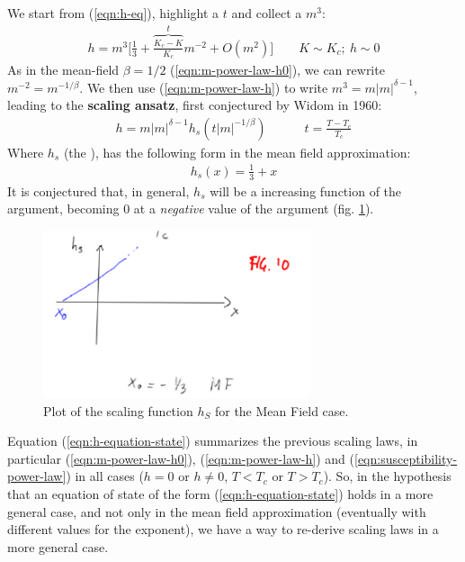 \documentclass[../../main.tex]{subfiles}
\begin{document}
We start from (\ref{eqn:h-eq}), highlight a $t$ and collect a $m^3$:
\begin{align*}
    h = m^3 \Bigg[\frac{1}{3} + \overbrace{\frac{K_c - K}{K_c}}^{t}m^{-2} + O(m^2) \Bigg] \qquad K \sim K_c;\> h\sim 0
\end{align*}
As in the mean-field $\beta = 1/2$ (\ref{eqn:m-power-law-h0}), we can rewrite $m^{-2} = m^{-1/\beta}$. We then use (\ref{eqn:m-power-law-h}) to write $m^3 = m|m|^{\delta-1}$, leading to the \textbf{scaling ansatz}, first conjectured by Widom in 1960:
\begin{align}\label{eqn:h-equation-state}
    h = m|m|^{\delta -1} h_s(t|m|^{-1/\beta}) \qquad  \quad t = \frac{T-T_c}{T_c}  
\end{align}
Where $h_s$ (the ), has the following form in the mean field approximation:
\begin{align*}
    h_s(x) = \frac{1}{3} + x
\end{align*}
It is conjectured that, in general, $h_s$ will be a increasing function of the argument, becoming $0$ at a \textit{negative} value of the argument (fig. \ref{fig:scaling-function}).

\begin{figure}[H]
    \centering
    \includegraphics[width=0.7\textwidth]{scaling-function.png}
    \caption{Plot of the scaling function $h_S$ for the Mean Field case.}
    \label{fig:scaling-function}
\end{figure}

Equation (\ref{eqn:h-equation-state}) summarizes the previous scaling laws, in particular (\ref{eqn:m-power-law-h0}), (\ref{eqn:m-power-law-h}) and (\ref{eqn:susceptibility-power-law}) in all cases ($h=0$ or $h\neq 0$, $T < T_c$ or $T > T_c$). So, in the hypothesis that an equation of state of the form (\ref{eqn:h-equation-state}) holds in a more general case, and not only in the mean field approximation (eventually with different values for the exponent), we have a way to re-derive scaling laws in a more general case.
\end{document}
